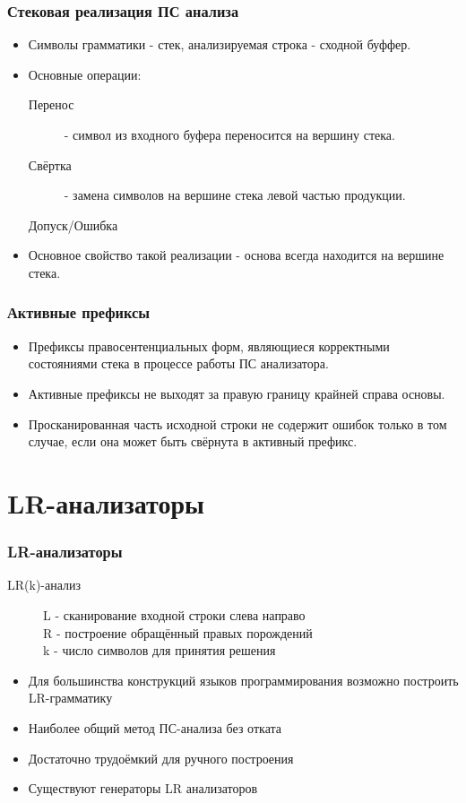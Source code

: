 \documentclass[16pt,pdf,unicode]{beamer}
\begin{document}
\begin{frame}
\frametitle{Стековая реализация ПС анализа}
\begin{itemize}
  \item Символы грамматики - стек, анализируемая строка - сходной буффер.
  \item Основные операции:
    \begin{description}
      \item[Перенос] - символ из входного буфера переносится на вершину стека.
      \item[Свёртка] - замена символов на вершине стека левой частью продукции.
      \item[Допуск/Ошибка]
    \end{description}
  \item Основное свойство такой реализации - основа всегда находится на вершине стека.
\end{itemize}
\end{frame}

\begin{frame}
\frametitle{Активные префиксы}
\begin{itemize}
  \item Префиксы правосентенциальных форм, являющиеся корректными состояниями стека в процессе работы ПС анализатора.
  \item Активные префиксы не выходят за правую границу крайней справа основы.
  \item Просканированная часть исходной строки не содержит ошибок только в том случае, если она может быть свёрнута в активный префикс.
\end{itemize}
\end{frame}

\section{LR-анализаторы}

\begin{frame}
\frametitle{LR-анализаторы}
\begin{description}
  \item[LR(k)-анализ] L - сканирование входной строки слева направо \\
                      R - построение обращённый правых порождений \\
                      k - число символов для принятия решения
\end{description}
\begin{itemize}
  \item Для большинства конструкций языков программирования возможно построить LR-грамматику
  \item Наиболее общий метод ПС-анализа без отката
  \item Достаточно трудоёмкий для ручного построения
  \item Существуют генераторы LR анализаторов
\end{itemize}
\end{frame}
\end{document}
